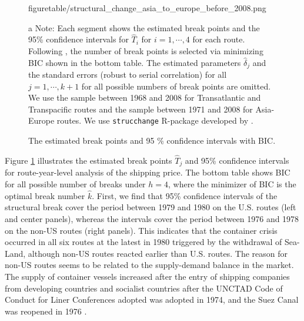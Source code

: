 \documentclass[11pt]{article}
\begin{document}
\begin{figure}[!ht]
\begin{minipage}[b]{0.3\linewidth}
  {figuretable/structural_change_asia_to_europe_before_2008.png}
  \end{minipage}
  {\scriptsize{}
  
\caption{The estimated break points and 95 \% confidence intervals with BIC.}
\label{fg:structural_change_transatlantic_eastbound_before_2008}
\begin{tablenotes}
\item[a]Note: Each segment shows the estimated break points and the 95\% confidence intervals for $\hat{T}_i$ for $i=1,\cdots,4$ for each route. Following \cite{bai2003computation}, the number of break points is selected via minimizing BIC shown in the bottom table. The estimated parameters $\hat{\delta}_j$ and the standard errors (robust to serial correlation) for all $j=1,\cdots,k+1$ for all possible numbers of break points are omitted. We use the sample between 1968 and 2008 for Transatlantic and Transpacific routes and the sample between 1971 and 2008 for Asia-Europe routes. We use \texttt{strucchange} R-package developed by \cite{zeileis2002strucchange}.
   \end{tablenotes}
   }
\end{figure}

Figure \ref{fg:structural_change_transatlantic_eastbound_before_2008} illustrates the estimated break points $\hat{T}_j$ and 95\% confidence intervals for route-year-level analysis of the shipping price. The bottom table shows BIC for all possible number of breaks under $h=4$, where the minimizer of BIC is the optimal break number $\hat{k}$. First, we find that 95\% confidence intervals of the structural break cover the period between 1979 and 1980 on the U.S. routes (left and center panels), whereas the intervals cover the period between 1976 and 1978 on the non-US routes (right panels). This indicates that the container crisis occurred in all six routes at the latest in 1980 triggered by the withdrawal of Sea-Land, although non-US routes reacted earlier than U.S. routes. The reason for non-US routes seems to be related to the supply-demand balance in the market. The supply of container vessels increased after the entry of shipping companies from developing countries and socialist countries after the UNCTAD Code of Conduct for Liner Conferences adopted was adopted in 1974, and the Suez Canal was reopened in 1976 \citep{jsme2022}.
\end{document}
